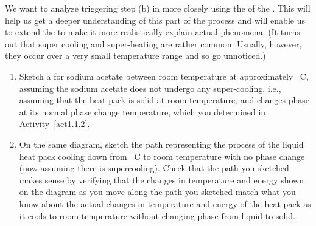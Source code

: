 \label{fnt1.1.3-3}

We want to analyze triggering step (b) in \hyperref[fnt1.1.3-2]{\thefnt} more closely using the \TempGraph{} of the \ThreePhaseModel{}. This will help us get a deeper understanding of this part of the process and will enable us to extend the \ThreePhaseModel{} to make it more realistically explain actual phenomena. (It turns out that super cooling and super-heating are rather common. Usually, however, they occur over a very small temperature range and so go unnoticed.)

\begin{enumerate}
	\item Sketch a \TempGraph{} for sodium acetate between room temperature at approximately \unit[150]{\textdegree C}, assuming the sodium acetate does not undergo any super-cooling, i.e., assuming that the heat pack is solid at room temperature, and changes phase at its normal phase change temperature, which you determined in \hyperref[act1.1.2]{Activity~\ref*{act1.1.2}}.
	
	\item On the same diagram, sketch the path representing the process of the liquid heat pack cooling down from \unit[150]{\textdegree C} to room temperature with no phase change (now assuming there is supercooling). Check that the path you sketched makes sense by verifying that the changes in temperature and energy shown on the diagram as you move along the path you sketched match what you know about the actual changes in temperature and energy of the heat pack as it cools to room temperature without changing phase from liquid to solid.
\end{enumerate}